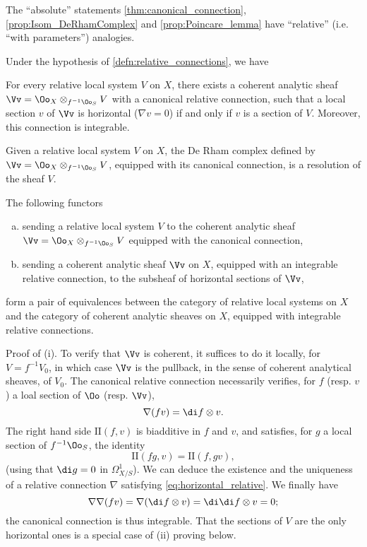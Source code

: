 The ``absolute'' statements
\ref{thm:canonical_connection}, \ref{prop:Isom_DeRhamComplex} and
\ref{prop:Poincare_lemma} have ``relative'' (i.e. ``with parameters'')
analogies.

\begin{theorem}\label{thm:Riemann–Hilbert correspondence}
  Under the hypothesis of \ref{defn:relative_connections}, we have
  \begin{paras}
    \item For every relative local system $V$ on $X$, there exists a coherent
    analytic sheaf $\Vv=\Oo_X\otimes_{f^{-1}\Oo_S}V$ with a canonical relative
    connection, such that a local section $v$ of $\Vv$ is horizontal
    ($\nabla v=0$) if and only if $v$ is a section of $V$.
    Moreover, this connection is integrable.
    \item Given a relative local system $V$ on $X$,
    the De Rham complex defined by $\Vv=\Oo_X\otimes_{f^{-1}\Oo_S}V$,
    equipped with its canonical connection,
    is a resolution of the sheaf $V$.
    \item The following functors
    \begin{enumerate}[a)]
      \item sending a relative local system $V$ to the coherent analytic sheaf
      $\Vv=\Oo_X\otimes_{f^{-1}\Oo_S}V$ equipped with the canonical connection,
      \item sending a coherent analytic sheaf $\Vv$ on $X$, equipped with an
      integrable relative connection, to the subsheaf of horizontal sections
      of $\Vv$,
    \end{enumerate}
    form a pair of equivalences between
    the category of relative local systems on $X$ and
    the category of coherent analytic sheaves on $X$, equipped with integrable
    relative connections.
  \end{paras}
\end{theorem}

Proof of (i).
To verify that $\Vv$ is coherent, it suffices to do it locally,
for $V=f^{-1}V_0$, in which case $\Vv$ is the pullback,
in the sense of coherent analytical sheaves, of $V_0$.
The canonical relative connection necessarily verifies, for $f$ (resp. $v$)
a loal section of $\Oo$ (resp. $\Vv$),
\begin{equation}\label{eq:horizontal_relative}
  \nabla(fv)=\di f\otimes v.
\end{equation}
The right hand side $\mathrm{I\!I}(f,v)$ is biadditive in $f$ and $v$, and
satisfies, for $g$ a local section of $f^{-1}\Oo_S$, the identity
\[
\mathrm{I\!I}(fg,v) = \mathrm{I\!I}(f,gv),
\]
(using that $\di g=0$ in $\Omega_{X/S}^1$).
We can deduce the existence and the uniqueness of a relative connection
$\nabla$ satisfying \cref{eq:horizontal_relative}. We finally have
\[
\nabla\nabla(fv)=\nabla(\di f\otimes v)=\di\di f\otimes v = 0;
\]
the canonical connection is thus integrable.
That the sections of $V$ are the only horizontal ones is a special case of (ii)
proving below.

